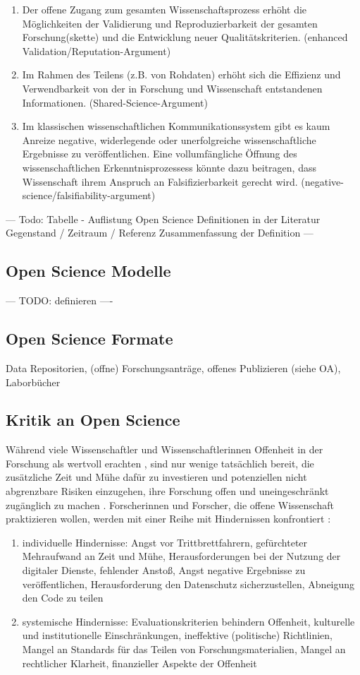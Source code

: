 \begin{enumerate}
\item Der offene Zugang zum gesamten Wissenschaftsprozess erhöht die Möglichkeiten der Validierung und Reproduzierbarkeit der gesamten Forschung(skette) und die Entwicklung neuer Qualitätskriterien. (enhanced Validation/Reputation-Argument)
\item Im Rahmen des Teilens (z.B. von Rohdaten) erhöht sich die Effizienz und Verwendbarkeit von der in Forschung und Wissenschaft entstandenen Informationen. (Shared-Science-Argument)
\item Im klassischen wissenschaftlichen Kommunikationssystem gibt es kaum Anreize negative, widerlegende oder unerfolgreiche wissenschaftliche Ergebnisse zu veröffentlichen. Eine vollumfängliche Öffnung des wissenschaftlichen Erkenntnisprozessess könnte dazu beitragen, dass Wissenschaft ihrem Anspruch an Falsifizierbarkeit gerecht wird. (negative-science/falsifiability-argument)
\end{enumerate}

--- Todo: Tabelle - Auflistung Open Science Definitionen in der Literatur
Gegenstand / Zeitraum / Referenz
Zusammenfassung der Definition ---

\subsection{Open Science Modelle}
--- TODO: definieren ----
\subsection{Open Science Formate}
Data Repositorien, (offne) Forschungsanträge, offenes Publizieren (siehe OA), Laborbücher

\subsection{Kritik an Open Science}

Während viele Wissenschaftler und Wissenschaftlerinnen Offenheit in der Forschung als wertvoll erachten \cite{suchen}, sind nur wenige tatsächlich bereit, die zusätzliche Zeit und Mühe dafür zu investieren und potenziellen nicht abgrenzbare Risiken einzugehen, ihre Forschung offen und uneingeschränkt zugänglich zu machen \cite{Scheliga_2014} \cite{Procter_2010}. Forscherinnen und Forscher, die offene Wissenschaft praktizieren wollen, werden mit einer Reihe mit Hindernissen konfrontiert \cite{Scheliga_2014}:
\begin{enumerate}
\item individuelle Hindernisse: Angst vor Trittbrettfahrern, gefürchteter Mehraufwand an Zeit und Mühe, Herausforderungen bei der Nutzung der digitaler Dienste, fehlender Anstoß, Angst negative Ergebnisse zu veröffentlichen, Herausforderung den Datenschutz sicherzustellen, Abneigung den Code zu teilen
\item systemische Hindernisse: Evaluationskriterien behindern Offenheit, kulturelle und institutionelle Einschränkungen, ineffektive (politische) Richtlinien, Mangel an Standards für das Teilen von Forschungsmaterialien, Mangel an rechtlicher Klarheit, finanzieller Aspekte der Offenheit
\end{enumerate}

